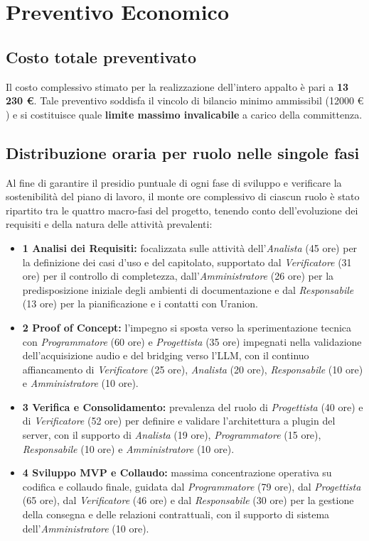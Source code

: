 \documentclass[12pt,a4paper]{article}
\newcommand{\tightlist}{\setlength{\itemsep}{1pt}\setlength{\parskip}{0pt}}
\begin{document}
\hypertarget{preventivo-economico}{%
\section{Preventivo Economico}}

\hypertarget{costo-totale-preventivato}{%
\subsection{Costo totale preventivato}}
Il costo complessivo stimato per la realizzazione dell'intero appalto è pari a \textbf{13 230 €}. Tale preventivo soddisfa il vincolo di bilancio minimo ammissibil (12000 € ) e si costituisce quale \textbf{limite massimo invalicabile} a carico della committenza.

\hypertarget{distribuzione-oraria-fasi-ruoli}{%
\subsection{Distribuzione oraria per ruolo nelle singole fasi}}
Al fine di garantire il presidio puntuale di ogni fase di sviluppo e verificare la sostenibilità del piano di lavoro, il monte ore complessivo di ciascun ruolo è stato ripartito tra le quattro macro-fasi del progetto, tenendo conto dell'evoluzione dei requisiti e della natura delle attività prevalenti:
\begin{itemize}
\tightlist
\item \textbf{1 Analisi dei Requisiti:}
focalizzata sulle attività dell'\textit{Analista} (45 ore) per la definizione dei casi d'uso e del capitolato, supportato dal \textit{Verificatore} (31 ore) per il controllo di completezza, dall'\textit{Amministratore} (26 ore) per la predisposizione iniziale degli ambienti di documentazione e dal \textit{Responsabile} (13 ore) per la pianificazione e i contatti con Uranion.
\item \textbf{2 Proof of Concept:} l'impegno si sposta verso la sperimentazione tecnica con \textit{Programmatore} (60 ore) e \textit{Progettista} (35 ore) impegnati nella validazione dell'acquisizione audio e del bridging verso l'LLM, con il continuo affiancamento di \textit{Verificatore} (25 ore), \textit{Analista} (20 ore), \textit{Responsabile} (10 ore) e \textit{Amministratore} (10 ore).
\item \textbf{3 Verifica e Consolidamento:} prevalenza del ruolo di \textit{Progettista} (40 ore) e di \textit{Verificatore} (52 ore) per definire e validare l'architettura a plugin del server, con il supporto di \textit{Analista} (19 ore), \textit{Programmatore} (15 ore), \textit{Responsabile} (10 ore) e \textit{Amministratore} (10 ore).
\item \textbf{4 Sviluppo MVP e Collaudo:} massima concentrazione operativa su codifica e collaudo finale, guidata dal \textit{Programmatore} (79 ore), dal \textit{Progettista} (65 ore), dal \textit{Verificatore} (46 ore) e dal \textit{Responsabile} (30 ore) per la gestione della consegna e delle relazioni contrattuali, con il supporto di sistema dell'\textit{Amministratore} (10 ore).
\end{itemize}
\end{document}
